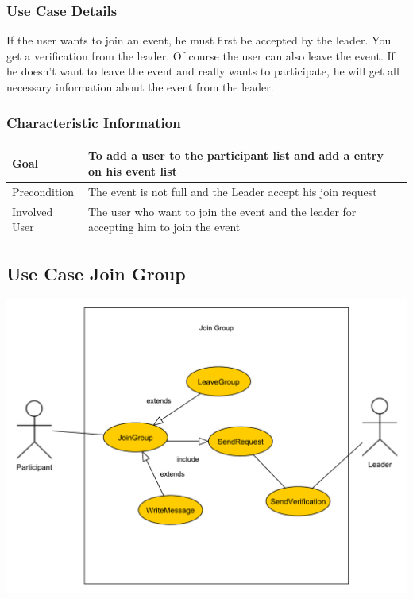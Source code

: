 \documentclass[12pt]{article}
\theoremstyle{definition}
\begin{document}
\subsubsection{Use Case Details}

If the user wants to join an event, he must first be accepted by the leader. You get a verification from the leader. Of course the user can also leave the event. If he doesn't want to leave the event and really wants to participate, he will get all necessary information about the event from the leader.

\subsubsection{Characteristic Information}

\begin{tabular}{|l|l|}
\hline
Goal & To add a user to the participant list and add a entry on his event list \\ \hline
Precondition &  The event is not full and the Leader accept his join request\\ \hline
Involved User &  The user who want to join the event and the leader for accepting him to join the event\\ \hline

\end{tabular}


\subsection{Use Case Join Group}

\includegraphics[scale=.5]{Usecase/JoinGroup.pdf}
\end{document}
